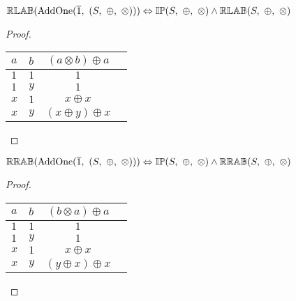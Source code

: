 \begin{theorem} \label{thm:addone_right_left_absorptive}
$\propname{RLAB}(\mathrm{AddOne}(\overline{1},\ (S,\ \oplus,\ \otimes))) \Leftrightarrow \propname{IP}(S,\ \oplus,\ \otimes) \wedge \propname{RLAB}(S,\ \oplus,\ \otimes)$
\end{theorem}

\begin{proof}
\begin{center}
\begin{tabular}{llcc}
\toprule
$a$ & $b$ & $(a \otimes b) \oplus a$ \\
\midrule
$1$ & $1$ & $1$ 			\\
$1$ & $y$ & $1$				\\
$x$ & $1$ & $x \oplus x$	\\
$x$ & $y$ & $(x \oplus y) \oplus x$	\\
\bottomrule
\end{tabular}
\end{center}
\end{proof}


\begin{theorem} \label{thm:addone_right_right_absorptive}
$\propname{RRAB}(\mathrm{AddOne}(\overline{1},\ (S,\ \oplus,\ \otimes))) \Leftrightarrow \propname{IP}(S,\ \oplus,\ \otimes) \wedge \propname{RRAB}(S,\ \oplus,\ \otimes)$
\end{theorem}

\begin{proof}
\begin{center}
\begin{tabular}{llcc}
\toprule
$a$ & $b$ & $(b \otimes a) \oplus a$ \\
\midrule
$1$ & $1$ & $1$ 			\\
$1$ & $y$ & $1$				\\
$x$ & $1$ & $x \oplus x$	\\
$x$ & $y$ & $(y \oplus x) \oplus x$	\\
\bottomrule
\end{tabular}
\end{center}
\end{proof}
